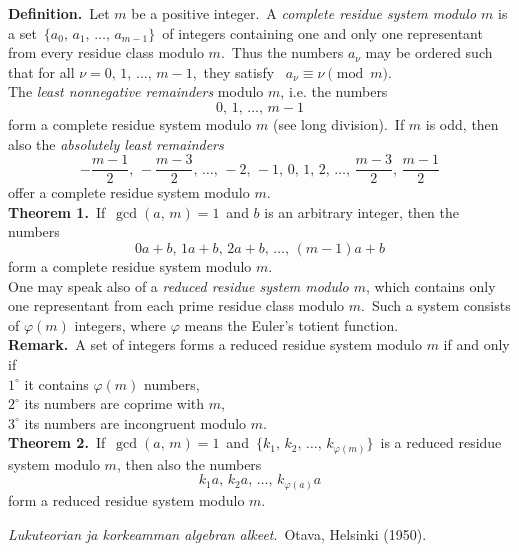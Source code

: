\documentclass[12pt]{article}
\theoremstyle{definition}
\begin{document}
\textbf{Definition.}\, Let $m$ be a positive integer.\, A {\em complete residue system modulo $m$} is a set\, $\{a_0,\,a_1,\,\ldots,\,a_{m-1}\}$\, of integers containing one and only one representant from every residue class modulo $m$.\, Thus the numbers $a_\nu$ may be ordered such that for all $\nu = 0,\,1,\,\ldots,\,m\!-\!1$,\, they satisfy \, $a_\nu \equiv \nu \pmod{m}$.\\

The {\em least nonnegative remainders} modulo $m$, i.e. the numbers
$$0,\,1,\,\ldots,\,m\!-\!1$$
form a complete residue system modulo $m$ (see long division).\, If $m$ is odd, then also the {\em absolutely least remainders}
$$-\frac{m\!-\!1}{2},\,-\frac{m\!-\!3}{2},\,\ldots,\,
-2,\,-1,\,0,\,1,\,2,\,\ldots,\,\frac{m\!-\!3}{2},\,\frac{m\!-\!1}{2}$$
offer a complete residue system modulo $m$.\\

\textbf{Theorem 1.}\, If\, $\gcd(a,\,m) = 1$\, and $b$ is an arbitrary integer, then the numbers
$$0a\!+\!b,\,1a\!+\!b,\,2a\!+\!b,\,\ldots,\,(m\!-\!1)a\!+\!b$$
form a complete residue system modulo $m$.\\


One may speak also of a {\em reduced residue system modulo $m$}, which contains only one representant from each prime residue class modulo $m$.\, Such a system consists of $\varphi(m)$ integers, where $\varphi$ means the Euler's totient function.\\

\textbf{Remark.}\, A set of integers forms a reduced residue system modulo $m$ if and only if\\
$1^\circ$ it contains $\varphi(m)$ numbers,\\
$2^\circ$ its numbers are coprime with $m$,\\
$3^\circ$ its numbers are incongruent modulo $m$.\\


\textbf{Theorem 2.}\, If\, $\gcd(a,\,m) = 1$\, and\, $\{k_1,\,k_2,\,\ldots,\,k_{\varphi(m)}\}$\, is a reduced residue system modulo $m$, then also the numbers
$$k_1a,\,k_2a,\,\ldots,\,k_{\varphi(a)}a$$
form a reduced residue system modulo $m$.\\

\begin{thebibliography}{9}
 {\em Lukuteorian ja korkeamman algebran alkeet}.\, Otava, Helsinki (1950).
\end{thebibliography}


\end{document}

